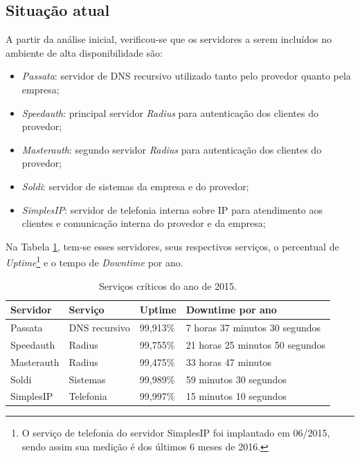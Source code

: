 \subsection{Situação atual}
\label{section:maqservcrit}

A partir da análise inicial, verificou-se que os servidores a serem incluídos no ambiente de alta disponibilidade são:
\begin{itemize}
 \item \textit{Passata}: servidor de \ac{DNS} recursivo utilizado tanto pelo provedor quanto pela empresa;
 \item \textit{Speedauth}: principal servidor \textit{Radius} para autenticação dos clientes do provedor;
 \item \textit{Masterauth}: segundo servidor \textit{Radius} para autenticação dos clientes do provedor;
 \item \textit{Soldi}: servidor de sistemas da empresa e do provedor;
 \item \textit{SimplesIP}: servidor de telefonia interna sobre \ac{IP} para atendimento aos clientes e comunicação interna do provedor e da empresa;
\end{itemize}

Na Tabela \ref{tab:dispservcrit}, tem-se esses servidores, seus respectivos serviços, o percentual de \textit{Uptime}\footnote[1]{O serviço de 
telefonia do servidor SimplesIP foi implantado em 06/2015, sendo assim sua medição é dos últimos 6 meses de 2016.} e o tempo de \textit{Downtime} 
por ano. 

\begin{table}[h!]
\caption{Serviços críticos do ano de 2015.}
\label{tab:dispservcrit}
\begin{center}
\begin{tabular}{|l|l|l|l|}\hline
\textbf{Servidor} & \textbf{Serviço} & \textbf{Uptime} & \textbf{Downtime por ano} \\\hline
Passata & DNS recursivo & 99,913\% & 7 horas 37 minutos 30 segundos \\\hline
Speedauth & Radius & 99,755\% & 21 horas 25 minutos 50 segundos \\\hline
Masterauth & Radius & 99,475\% & 33 horas 47 minutos \\\hline
Soldi & Sistemas & 99,989\% & 59 minutos 30 segundos \\\hline
SimplesIP & Telefonia & 99,997\% & 15 minutos 10 segundos \\\hline %
\end{tabular}
\end{center}
\end{table}


